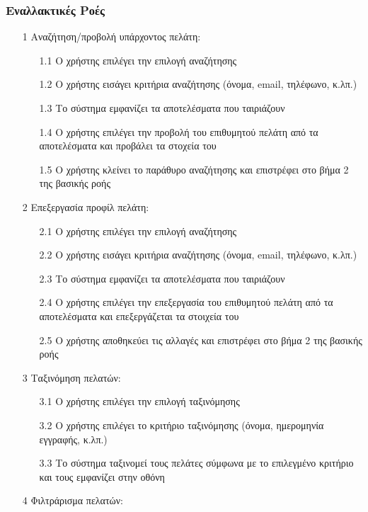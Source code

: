 \documentclass[12pt,a4paper,twoside]{book}
\begin{document}
\subsubsection{Εναλλακτικές Ροές}
\begin{enumerate}
  \item[1 ] Αναζήτηση/προβολή υπάρχοντος πελάτη:
    \begin{enumerate}
        \item[1.1 ] Ο χρήστης επιλέγει την επιλογή αναζήτησης
        \item[1.2 ] Ο χρήστης εισάγει κριτήρια αναζήτησης (όνομα, email, τηλέφωνο, κ.λπ.)
        \item[1.3 ] Το σύστημα εμφανίζει τα αποτελέσματα που ταιριάζουν
        \item[1.4 ] Ο χρήστης επιλέγει την προβολή του επιθυμητού πελάτη από τα αποτελέσματα και προβάλει τα στοχεία του
        \item[1.5 ] Ο χρήστης κλείνει το παράθυρο αναζήτησης και επιστρέφει στο βήμα 2 της βασικής ροής
    \end{enumerate}
  \item[2 ] Επεξεργασία προφίλ πελάτη:
    \begin{enumerate}
        \item [2.1 ] Ο χρήστης επιλέγει την επιλογή αναζήτησης
        \item [2.2 ] Ο χρήστης εισάγει κριτήρια αναζήτησης (όνομα, email, τηλέφωνο, κ.λπ.)
        \item [2.3 ] Το σύστημα εμφανίζει τα αποτελέσματα που ταιριάζουν
        \item [2.4 ] Ο χρήστης επιλέγει την επεξεργασία του επιθυμητού πελάτη από τα αποτελέσματα και επεξεργάζεται τα στοιχεία του
        \item [2.5 ] Ο χρήστης αποθηκεύει τις αλλαγές και επιστρέφει στο βήμα 2 της βασικής ροής
    \end{enumerate}
  \item[3 ] Ταξινόμηση πελατών:
    \begin{enumerate}
        \item [3.1 ] Ο χρήστης επιλέγει την επιλογή ταξινόμησης
        \item [3.2 ] Ο χρήστης επιλέγει το κριτήριο ταξινόμησης (όνομα, ημερομηνία εγγραφής, κ.λπ.)
        \item [3.3 ] Το σύστημα ταξινομεί τους πελάτες σύμφωνα με το επιλεγμένο κριτήριο και τους εμφανίζει στην οθόνη
    \end{enumerate}
  \item[4 ] Φιλτράρισμα πελατών:

\end{enumerate}
\end{document}
